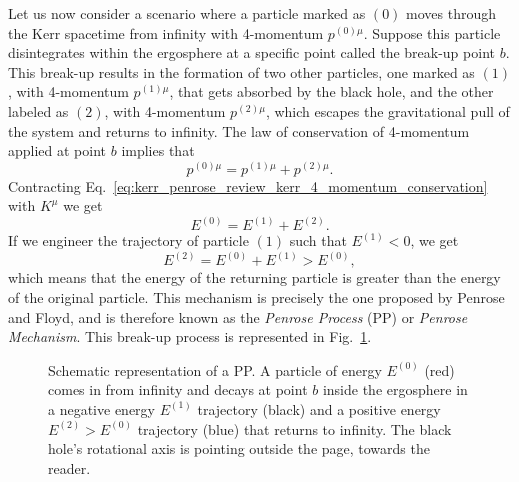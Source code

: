 Let us now consider a scenario where a particle marked as $(0)$ moves through the Kerr spacetime from infinity with 4-momentum $p^{(0)\mu}$. Suppose this particle disintegrates within the ergosphere at a specific point called the break-up point $b$. This break-up results in the formation of two other particles, one marked as $(1)$, with 4-momentum $p^{(1)\mu}$, that gets absorbed by the black hole, and the other labeled as $(2)$, with 4-momentum $p^{(2)\mu}$, which escapes the gravitational pull of the system and returns to infinity. The law of conservation of 4-momentum applied at point $b$ implies that
%
\begin{equation}
  p^{(0)\mu} = p^{(1)\mu} + p^{(2)\mu}.
  \label{eq:kerr_penrose_review_kerr_4_momentum_conservation}
\end{equation}
%
Contracting Eq.~\eqref{eq:kerr_penrose_review_kerr_4_momentum_conservation} with $K^\mu$ we get
\begin{equation}
  E^{(0)} = E^{(1)} + E^{(2)}.
  \label{eq:kerr_penrose_review_kerr_energy_conservation}
\end{equation}
%
If we engineer the trajectory of particle $(1)$ such that $E^{(1)} < 0$, we get
\begin{equation}
  E^{(2)} = E^{(0)} + E^{(1)} > E^{(0)},
  \label{eq:kerr_penrose_review_kerr_energy_increase}
\end{equation}
%
which means that the energy of the returning particle is greater than the energy of the original particle. This mechanism is precisely the one proposed by Penrose and Floyd, and is therefore known as the \emph{Penrose Process} (\ac{PP}) or \emph{Penrose Mechanism}. This break-up process is represented in Fig.~\ref{fig:kerr_penrose_review_kerr_breakup}.

\begin{figure}[!ht]
  \centering
  
  \caption{Schematic representation of a \ac{PP}. A particle of energy $E^{(0)}$ (red) comes in from infinity and decays at point $b$ inside the ergosphere in a negative energy $E^{(1)}$ trajectory (black) and a positive energy $E^{(2)}>E^{(0)}$ trajectory (blue) that returns to infinity. The black hole's rotational axis is pointing outside the page, towards the reader.}
  \label{fig:kerr_penrose_review_kerr_breakup}
\end{figure}

